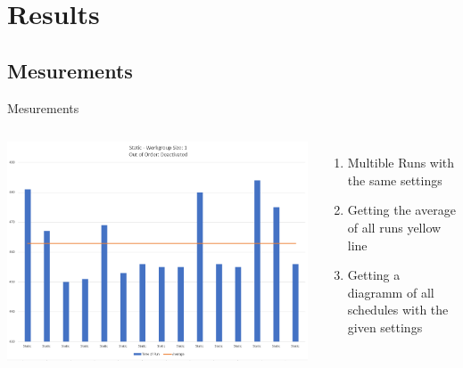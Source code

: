 \documentclass{beamer}
\begin{document}
\section{Results}
\subsection{Mesurements}
\begin{frame}{Mesurements}
	\begin{columns}
		\includegraphics[width=\textwidth]{res/SerialExample.PNG}
		\begin{enumerate}
			\item Multible Runs with the same settings
			\item Getting the average of all runs yellow line
			\item Getting a diagramm of all schedules with the given settings
		\end{enumerate}
	\end{columns}
\end{frame}
\end{document}
